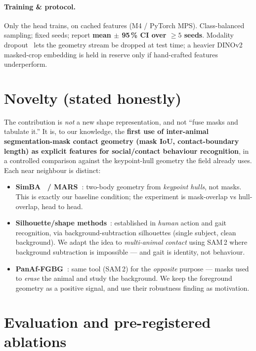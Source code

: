 \documentclass[11pt]{article}
\begin{document}
\paragraph{Training \& protocol.} Only the head trains, on cached features (M4 / PyTorch MPS).
Class-balanced sampling; fixed seeds; report \textbf{mean $\pm$ 95\,\% CI over $\geq 5$ seeds}.
Modality dropout~\cite{actionmae} lets the geometry stream be dropped at test time; a heavier
DINOv2~\cite{dinov2} masked-crop embedding is held in reserve only if hand-crafted features
underperform.

\section{Novelty (stated honestly)}
The contribution is \emph{not} a new shape representation, and not ``fuse masks and tabulate it.''
It is, to our knowledge, the \textbf{first use of inter-animal segmentation-mask contact geometry
(mask IoU, contact-boundary length) as explicit features for social/contact behaviour
recognition}, in a controlled comparison against the keypoint-hull geometry the field already
uses. Each near neighbour is distinct:
\begin{itemize}
  \item \textbf{SimBA~\cite{simba} / MARS~\cite{mars}}: two-body geometry from \emph{keypoint
    hulls}, not masks. This is exactly our baseline condition; the experiment is mask-overlap vs
    hull-overlap, head to head.
  \item \textbf{Silhouette/shape methods}~\cite{bobickdavis,spacetimeshapes,gaitsurvey}: established
    in \emph{human} action and gait recognition, via background-subtraction silhouettes (single
    subject, clean background). We adapt the idea to \emph{multi-animal contact} using SAM\,2 where
    background subtraction is impossible — and gait is identity, not behaviour.
  \item \textbf{PanAf-FGBG~\cite{panaf}}: same tool (SAM\,2) for the \emph{opposite} purpose —
    masks used to \emph{erase} the animal and study the background. We keep the foreground geometry
    as a positive signal, and use their robustness finding as motivation.
\end{itemize}

\section{Evaluation and pre-registered ablations}
\end{document}
